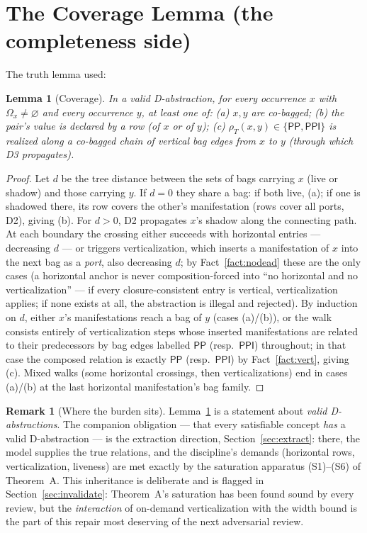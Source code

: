 \documentclass[11pt]{article}
\newtheorem{lemma}[theorem]{Lemma}
\theoremstyle{definition}
\newtheorem{remark}[theorem]{Remark}
\newcommand{\PP}{\mathsf{PP}}
\newcommand{\PPI}{\mathsf{PPI}}
\begin{document}
\section{The Coverage Lemma (the completeness side)}\label{sec:cover}

The truth lemma used:

\begin{lemma}[Coverage]\label{lem:coverage}
In a valid D-abstraction, for every occurrence $x$ with
$\Omega_x\neq\varnothing$ and every occurrence $y$, at least one of:
(a) $x,y$ are co-bagged;
(b) the pair's value is declared by a row (of $x$ or of $y$);
(c) $\rho_T(x,y)\in\{\PP,\PPI\}$ is realized along a co-bagged chain of
vertical bag edges from $x$ to $y$ (through which D3 propagates).
\end{lemma}

\begin{proof}
Let $d$ be the tree distance between the sets of bags carrying $x$
(live or shadow) and those carrying $y$.  If $d=0$ they share a bag: if
both live, (a); if one is shadowed there, its row covers the other's
manifestation (rows cover all ports, D2), giving (b).  For $d>0$, D2
propagates $x$'s shadow along the connecting path.  At each boundary the
crossing either succeeds with horizontal entries --- decreasing $d$ ---
or triggers verticalization, which inserts a manifestation of $x$ into
the next bag as a \emph{port}, also decreasing $d$; by
Fact~\ref{fact:nodead} these are the only cases (a horizontal anchor is
never composition-forced into ``no horizontal and no verticalization''
--- if every closure-consistent entry is vertical, verticalization
applies; if none exists at all, the abstraction is illegal and rejected).
By induction on $d$, either $x$'s manifestations reach a bag of $y$
(cases (a)/(b)), or the walk consists entirely of verticalization steps
whose inserted manifestations are related to their predecessors by bag
edges labelled $\PP$ (resp.\ $\PPI$) throughout; in that case the
composed relation is exactly $\PP$ (resp.\ $\PPI$) by
Fact~\ref{fact:vert}, giving (c).  Mixed walks (some horizontal
crossings, then verticalizations) end in cases (a)/(b) at the last
horizontal manifestation's bag family.
\end{proof}

\begin{remark}[Where the burden sits]
Lemma~\ref{lem:coverage} is a statement about \emph{valid
D-abstractions}.  The companion obligation --- that every satisfiable
concept \emph{has} a valid D-abstraction --- is the extraction direction,
Section~\ref{sec:extract}: there, the model supplies the true relations,
and the discipline's demands (horizontal rows, verticalization,
liveness) are met exactly by the saturation apparatus (S1)--(S6) of
Theorem~A.  This inheritance is deliberate and is flagged in
Section~\ref{sec:invalidate}: Theorem~A's saturation has been found sound
by every review, but the \emph{interaction} of on-demand verticalization
with the width bound is the part of this repair most deserving of the
next adversarial review.
\end{remark}
\end{document}
